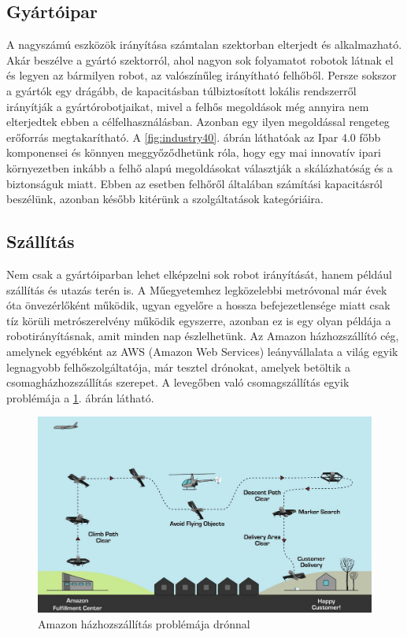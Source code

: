\subsection{Gyártóipar}
A nagyszámú eszközök irányítása számtalan szektorban elterjedt és alkalmazható. Akár beszélve a gyártó szektorról, ahol nagyon sok folyamatot robotok látnak el és legyen az bármilyen robot, az valószínűleg irányítható felhőből. Persze sokszor a gyártók egy drágább, de kapacitásban túlbiztosított lokális rendszerről irányítják a gyártórobotjaikat, mivel a felhős megoldások még annyira nem elterjedtek ebben a célfelhasználásban. Azonban egy ilyen megoldással rengeteg erőforrás megtakarítható.
A \ref{fig:industry40}. ábrán láthatóak az Ipar 4.0 főbb komponensei és könnyen meggyőződhetünk róla, hogy egy mai innovatív ipari környezetben inkább a felhő alapú megoldásokat választják a skálázhatóság és a biztonságuk miatt. Ebben az esetben felhőről általában számítási kapacitásról beszélünk, azonban később kitérünk a szolgáltatások kategóriáira.

\subsection{Szállítás}
Nem csak a gyártóiparban lehet elképzelni sok robot irányítását, hanem például szállítás és utazás terén is. A Műegyetemhez legközelebbi metróvonal már évek óta önvezérlőként működik, ugyan egyelőre a hossza befejezetlensége miatt csak tíz körüli metrószerelvény működik egyszerre, azonban ez is egy olyan példája a robotirányításnak, amit minden nap észlelhetünk. Az Amazon házhozszállító cég, amelynek egyébként az AWS (Amazon Web Services) leányvállalata a világ egyik legnagyobb felhőszolgáltatója, már tesztel drónokat, amelyek betöltik a csomagházhozszállítás szerepet. A levegőben való csomagszállítás egyik problémája a \ref{fig:drone-delivery}. ábrán látható.
\begin{figure}
	\centering
	\includegraphics[width=\linewidth]{figures/aws-drone-delivery.jpg}
	\caption{Amazon házhozszállítás problémája drónnal \cite{drone-delivery}}
	\label{fig:drone-delivery}
\end{figure}
